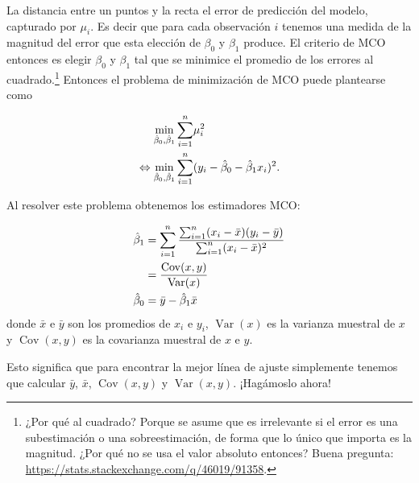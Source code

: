 \documentclass{article}\usepackage[]{graphicx}\usepackage[]{color}
\newcommand{\Var}{\operatorname{Var}}
\newcommand{\Cov}{\operatorname{Cov}}
\begin{document}
La distancia entre un puntos y la recta el error de predicción del modelo, capturado por $\mu_i$. Es decir que para cada observación $i$ tenemos una medida de la magnitud del error que esta elección de $\beta_0$ y $\beta_1$ produce. El criterio de MCO entonces es elegir $\beta_0$ y $\beta_1$ tal que se minimice el promedio de los errores al cuadrado.\footnote{¿Por qué al cuadrado? Porque se asume que es irrelevante si el error es una subestimación o una sobreestimación, de forma que lo único que importa es la magnitud. ¿Por qué no se usa el valor absoluto entonces? Buena pregunta: \url{https://stats.stackexchange.com/q/46019/91358}.}
Entonces el problema de minimización de MCO puede plantearse como

\begin{align}
\min_{\hat\beta_0,\hat\beta_1} \sum_{i=1}^n & \mu_i^2 \notag \\
\Leftrightarrow \min_{\hat\beta_0,\hat\beta_1} \sum_{i=1}^n & (y_i - \hat\beta_0 - \hat\beta_1 x_i)^2.
\end{align}

Al resolver este problema obtenemos los estimadores MCO:

\begin{align}
\hat \beta_1 &= \sum_{i=1}^n \frac{\sum_{i=1}^n (x_i - \bar x)(y_i - \bar y)}{\sum_{i=1}^n (x_i - \bar x)^2} \notag \\
 &= \frac{\Cov (x,y)}{\Var(x)} \\
\hat \beta_0 &= \bar y - \hat\beta_1 \bar x
\end{align}
donde $\bar x$ e $\bar y$ son los promedios de $x_i$ e $y_i$, $\Var(x)$ es la varianza muestral de $x$ y $\Cov(x,y)$ es la covarianza muestral de $x$ e $y$.

Esto significa que para encontrar la mejor línea de ajuste simplemente tenemos que calcular $\bar y$, $\bar x$, $\Cov (x,y)$ y $\Var (x,y)$. ¡Hagámoslo ahora!
\end{document}
